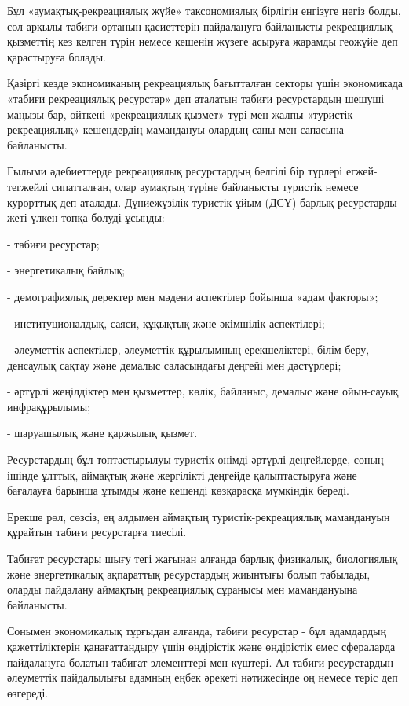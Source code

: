 \begin{multicols}{2}
Бұл «аумақтық-рекреациялық жүйе» таксономиялық бірлігін енгізуге негіз
болды, сол арқылы табиғи ортаның қасиеттерін пайдалануға байланысты
рекреациялық қызметтің кез келген түрін немесе кешенін жүзеге асыруға
жарамды геожүйе деп қарастыруға болады.

Қазіргі кезде экономиканың рекреациялық бағытталған секторы үшін
экономикада «табиғи рекреациялық ресурстар» деп аталатын табиғи
ресурстардың шешуші маңызы бар, өйткені «рекреациялық қызмет» түрі мен
жалпы «туристік-рекреациялық» кешендердің мамандануы олардың саны мен
сапасына байланысты.

Ғылыми әдебиеттерде рекреациялық ресурстардың белгілі бір түрлері
егжей-тегжейлі сипатталған, олар аумақтың түріне байланысты туристік
немесе курорттық деп аталады. Дүниежүзілік туристік ұйым (ДСҰ) барлық
ресурстарды жеті үлкен топқа бөлуді ұсынды:

- табиғи ресурстар;

- энергетикалық байлық;

- демографиялық деректер мен мәдени аспектілер бойынша «адам факторы»;

- институционалдық, саяси, құқықтық және әкімшілік аспектілері;

- әлеуметтік аспектілер, әлеуметтік құрылымның ерекшеліктері, білім
беру, денсаулық сақтау және демалыс саласындағы деңгейі мен дәстүрлері;

- әртүрлі жеңілдіктер мен қызметтер, көлік, байланыс, демалыс және
ойын-сауық инфрақұрылымы;

- шаруашылық және қаржылық қызмет.

Ресурстардың бұл топтастырылуы туристік өнімді әртүрлі деңгейлерде,
соның ішінде ұлттық, аймақтық және жергілікті деңгейде қалыптастыруға
және бағалауға барынша ұтымды және кешенді көзқарасқа мүмкіндік береді.

Ерекше рөл, сөзсіз, ең алдымен аймақтың туристік-рекреациялық
мамандануын құрайтын табиғи ресурстарға тиесілі.

Табиғат ресурстары шығу тегі жағынан алғанда барлық физикалық,
биологиялық және энергетикалық ақпараттық ресурстардың жиынтығы болып
табылады, оларды пайдалану аймақтың рекреациялық сұранысы мен
мамандануына байланысты.

Сонымен экономикалық тұрғыдан алғанда, табиғи ресурстар - бұл адамдардың
қажеттіліктерін қанағаттандыру үшін өндірістік және өндірістік емес
сфераларда пайдалануға болатын табиғат элементтері мен күштері. Ал
табиғи ресурстардың әлеуметтік пайдалылығы адамның еңбек әрекеті
нәтижесінде оң немесе теріс деп өзгереді.


\end{multicols}
